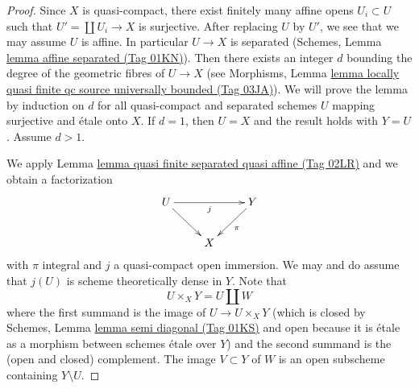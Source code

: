 \documentclass{amsart}
\theoremstyle{plain}
\theoremstyle{definition}
\theoremstyle{remark}
\numberwithin{equation}{subsection}
\begin{document}
\begin{proof}
Since $X$ is quasi-compact, there exist finitely many affine opens
$U_i \subset U$ such that $U' = \coprod U_i \to X$ is surjective.
After replacing $U$ by $U'$, we see that we may assume $U$ is affine.
In particular $U \to X$ is separated
(Schemes, Lemma \href{https://stacks.math.columbia.edu/tag/01KN}{lemma affine separated (Tag 01KN)}).
Then there exists an integer $d$ bounding the degree of the geometric
fibres of $U \to X$ (see Morphisms, Lemma
\href{https://stacks.math.columbia.edu/tag/03JA}{lemma locally quasi finite qc source universally bounded (Tag 03JA)}).
We will prove the lemma by induction on $d$ for all quasi-compact
and separated schemes $U$ mapping surjective and \'etale onto $X$.
If $d = 1$, then $U = X$ and the result holds with $Y = U$.
Assume $d > 1$.

\medskip\noindent
We apply Lemma \href{https://stacks.math.columbia.edu/tag/02LR}{lemma quasi finite separated quasi affine (Tag 02LR)}
and we obtain a factorization
$$
\xymatrix{
U \ar[rr]_j \ar[rd] & & Y \ar[ld]^\pi \\
& X
}
$$
with $\pi$ integral and $j$ a quasi-compact open immersion. We may and do
assume that $j(U)$ is scheme theoretically dense in $Y$. Note that
$$
U \times_X Y = U \amalg W
$$
where the first summand is the image of $U \to U \times_X Y$
(which is closed by
Schemes, Lemma \href{https://stacks.math.columbia.edu/tag/01KS}{lemma semi diagonal (Tag 01KS)}
and open because it is \'etale as a morphism between schemes \'etale over $Y$)
and the second summand is the (open and closed) complement.
The image $V \subset Y$ of $W$ is an open subscheme containing
$Y \setminus U$.


\end{proof}
\end{document}
